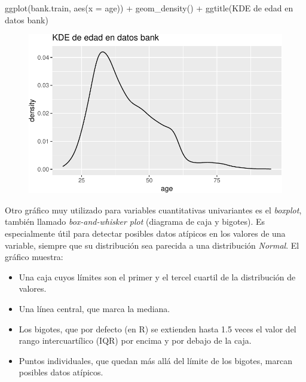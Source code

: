 \documentclass[
  letterpaper,
  DIV=11,
  numbers=noendperiod]{scrreprt}
\newenvironment{Shaded}{\begin{snugshade}}{\end{snugshade}}
\newcommand{\AttributeTok}[1]{\textcolor[rgb]{0.40,0.45,0.13}{#1}}
\newcommand{\FunctionTok}[1]{\textcolor[rgb]{0.28,0.35,0.67}{#1}}
\newcommand{\NormalTok}[1]{\textcolor[rgb]{0.00,0.23,0.31}{#1}}
\newcommand{\SpecialCharTok}[1]{\textcolor[rgb]{0.37,0.37,0.37}{#1}}
\newcommand{\StringTok}[1]{\textcolor[rgb]{0.13,0.47,0.30}{#1}}
\begin{document}
\begin{Shaded}
\begin{Highlighting}[]
\FunctionTok{ggplot}\NormalTok{(bank.train, }\FunctionTok{aes}\NormalTok{(}\AttributeTok{x =}\NormalTok{ age)) }\SpecialCharTok{+}
\FunctionTok{geom\_density}\NormalTok{() }\SpecialCharTok{+}
\FunctionTok{ggtitle}\NormalTok{(}\StringTok{\textquotesingle{}KDE de edad en datos bank\textquotesingle{}}\NormalTok{)}
\end{Highlighting}
\end{Shaded}

\begin{figure}[H]

{\centering \includegraphics{eda_files/figure-pdf/unnamed-chunk-11-1.pdf}

}

\end{figure}

Otro gráfico muy utilizado para variables cuantitativas univariantes es
el \emph{boxplot}, también llamado \emph{box-and-whisker plot} (diagrama
de caja y bigotes). Es especialmente útil para detectar posibles datos
atípicos en los valores de una variable, siempre que su distribución sea
parecida a una distribución \emph{Normal}. El gráfico muestra:

\begin{itemize}
\item
  Una caja cuyos límites son el primer y el tercel cuartil de la
  distribución de valores.
\item
  Una línea central, que marca la mediana.
\item
  Los bigotes, que por defecto (en R) se extienden hasta 1.5 veces el
  valor del rango intercuartílico (IQR) por encima y por debajo de la
  caja.
\item
  Puntos individuales, que quedan más allá del límite de los bigotes,
  marcan posibles datos atípicos.
\end{itemize}
\end{document}
